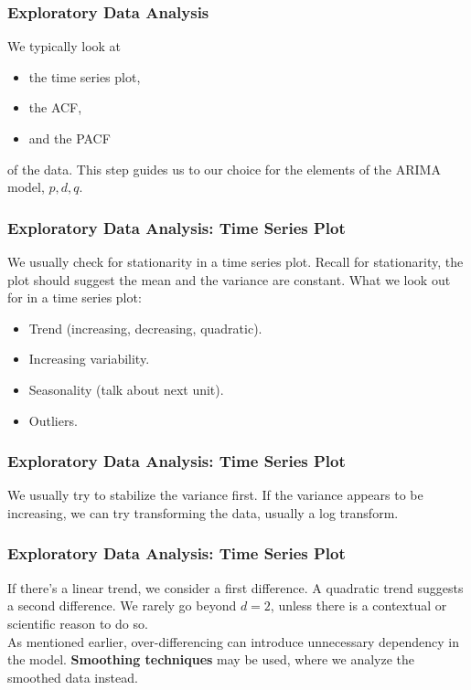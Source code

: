 \documentclass[%
xcolor=pdftex]{beamer}
\begin{document}


\begin{frame}
\frametitle{Exploratory Data Analysis}

We typically look at

\begin{itemize}
\item the time series plot,
\item the ACF,
\item and the PACF
\end{itemize}

of the data. This step guides us to our choice for the elements of the ARIMA model, $p,d,q$.

\end{frame}

\begin{frame}
\frametitle{Exploratory Data Analysis: Time Series Plot}

We usually check for stationarity in a time series plot. Recall for stationarity, the plot should suggest the mean and the variance are constant. What we look out for in a time series plot:

\begin{itemize}
\item Trend (increasing, decreasing, quadratic).
\item Increasing variability.
\item Seasonality (talk about next unit).
\item Outliers.
\end{itemize}


\end{frame}

\begin{frame}
\frametitle{Exploratory Data Analysis: Time Series Plot}


We usually try to stabilize the variance first. If the variance appears to be increasing, we can try transforming the data, usually a log transform.

\end{frame}

\begin{frame}
\frametitle{Exploratory Data Analysis: Time Series Plot}

If there's a linear trend, we consider a first difference. A quadratic trend suggests a second difference. We rarely go beyond $d=2$, unless there is a contextual or scientific reason to do so. \\
\vspace{5mm}
As mentioned earlier, over-differencing can introduce unnecessary dependency in the model. \textbf{Smoothing techniques} may be used, where we analyze the smoothed data instead.

\end{frame}
\end{document}

